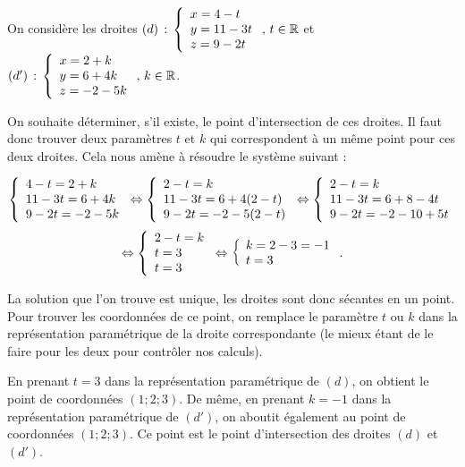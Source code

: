 \documentclass[11pt,fleqn, openany]{book} %
\begin{document}
\begin{example}On considère les droites $(d)\,:\,\left\{ \renewcommand{\arraystretch}{1}\begin{array}{l}x=4-t \\ y=11-3t \\ z = 9-2t \\
\end{array}\right.,\, t \in \mathbb{R}$ et $(d')\,:\,\left\{ \renewcommand{\arraystretch}{1}\begin{array}{l}x=2+k \\ y=6+4k \\ z = -2-5k \\
\end{array}\right.,\, k \in \mathbb{R}$.

On souhaite déterminer, s'il existe, le point d'intersection de ces droites. Il faut donc trouver deux paramètres $t$ et $k$ qui correspondent à un même point pour ces deux droites. Cela nous amène à résoudre le système suivant :

\[\left\{\renewcommand{\arraystretch}{1}\begin{array}{l}4-t=2+k \\ 11-3t=6+4k \\ 9-2t=-2-5k \\\end{array}\right. \Leftrightarrow \left\{\renewcommand{\arraystretch}{1}\begin{array}{l}2-t=k \\ 11-3t=6+4(2-t) \\ 9-2t=-2-5(2-t) \\\end{array}\right. \Leftrightarrow \left\{\renewcommand{\arraystretch}{1}\begin{array}{l}2-t=k \\ 11-3t=6+8-4t \\ 9-2t=-2-10+5t \\\end{array}\right.\]
\[  \Leftrightarrow \left\{\renewcommand{\arraystretch}{1}\begin{array}{l}2-t=k \\ t=3 \\ t=3 \\\end{array}\right.\Leftrightarrow \left\{\renewcommand{\arraystretch}{1}\begin{array}{l}k=2-3=-1 \\ t=3  \\\end{array}\right. .\]

La solution que l'on trouve est unique, les droites sont donc sécantes en un point. Pour trouver les coordonnées de ce point, on remplace le paramètre $t$ ou $k$ dans la représentation paramétrique de la droite correspondante (le mieux étant de le faire pour les deux pour contrôler nos calculs).

En prenant $t=3$ dans la représentation paramétrique de $(d)$, on obtient le point de coordonnées $(1;2;3)$. De même, en prenant $k=-1$ dans la représentation paramétrique de $(d')$, on aboutit également au point de coordonnées $(1;2;3)$. Ce point est le point d'intersection des droites $(d)$ et $(d')$.
\end{example}
\end{document}
